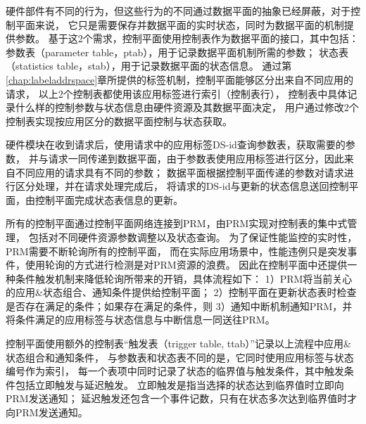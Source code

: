 硬件部件有不同的行为，但这些行为的不同通过数据平面的抽象已经屏蔽，对于控制平面来说，
它只是需要保存并数据平面的实时状态，同时为数据平面的机制提供参数。
基于这2个需求，控制平面使用控制表作为数据平面的接口，其中包括：
参数表（parameter table，ptab），用于记录数据平面机制所需的参数；
状态表（statistics table，stab），用于记录数据平面的状态信息。
通过第\ref{chap:labeladdrspace}章所提供的标签机制，控制平面能够区分出来自不同应用的请求，
以上2个控制表都使用该应用标签进行索引（控制表行），
控制表中具体记录什么样的控制参数与状态信息由硬件资源及其数据平面决定，
用户通过修改2个控制表实现按应用区分的数据平面控制与状态获取。

硬件模块在收到请求后，使用请求中的应用标签DS-id查询参数表，获取需要的参数，
并与请求一同传递到数据平面，由于参数表使用应用标签进行区分，因此来自不同应用的请求具有不同的参数；
数据平面根据控制平面传递的参数对请求进行区分处理，并在请求处理完成后，
将请求的DS-id与更新的状态信息送回控制平面，由控制平面完成状态表信息的更新。

所有的控制平面通过控制平面网络连接到PRM，由PRM实现对控制表的集中式管理，
包括对不同硬件资源参数调整以及状态查询。
为了保证性能监控的实时性，PRM需要不断轮询所有的控制平面，
而在实际应用场景中，性能违例只是突发事件，使用轮询的方式进行检测是对PRM资源的浪费。
因此在控制平面中还提供一种条件触发机制来降低轮询所带来的开销，具体流程如下：
1）PRM将当前关心的应用\&状态组合、通知条件提供给控制平面；
2）控制平面在更新状态表时检查是否存在满足的条件；如果存在满足的条件，则
3）通知中断机制通知PRM，并将条件满足的应用标签与状态信息与中断信息一同送往PRM。

控制平面使用额外的控制表``触发表（trigger table, ttab）''记录以上流程中应用\&状态组合和通知条件，
与参数表和状态表不同的是，它同时使用应用标签与状态编号作为索引，
每一个表项中同时记录了状态的临界值与触发条件，其中触发条件包括立即触发与延迟触发。
立即触发是指当选择的状态达到临界值时立即向PRM发送通知；
延迟触发还包含一个事件记数，只有在状态多次达到临界值时才向PRM发送通知。

